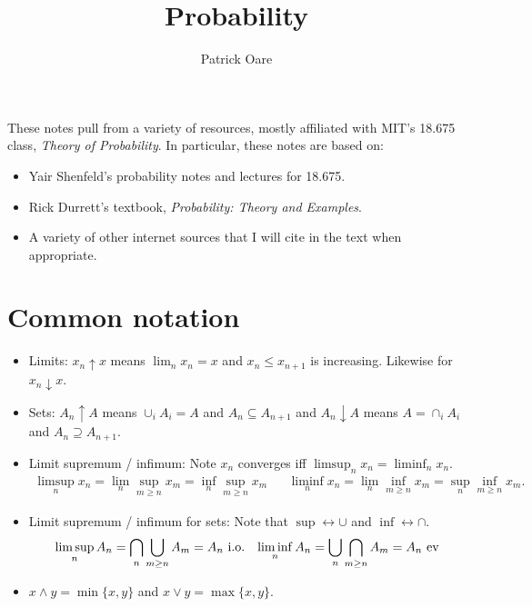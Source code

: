 \def \root {../../}			%


\newcommand{\sigB}{\sigma(\mathcal{B}_{1})}
\newcommand{\Leb}{\mathrm{Leb}}
\newcommand{\io}{\;\mathrm{i.o.}}
\newcommand{\ev}{\;\mathrm{e.v.}}

\renewcommand{\P}{\mathbb{P}}

\DeclareRobustCommand\circled[1]{\tikz[baseline=(char.base)]{\node[shape=circle,draw,inner sep=2pt] (char) {#1};}}

\title{Probability}
\author{Patrick Oare}
\date{}							%


\maketitle

 \begin{resources}
These notes pull from a variety of resources, mostly affiliated with MIT's 18.675 class, \textit{Theory of Probability}. In particular, these notes are based on:
\begin{itemize}
	\item Yair Shenfeld's probability notes and lectures for 18.675.
	\item Rick Durrett's textbook, \textit{Probability: Theory and Examples}. 
	\item A variety of other internet sources that I will cite in the text when appropriate.
\end{itemize}
\end{resources}

\section*{Common notation}

\begin{itemize}
	\item Limits: $x_n\uparrow x$ means $\lim_n x_n = x$ and $x_n \leq x_{n + 1}$ is increasing. Likewise for $x_n\downarrow x$. 
	\item Sets: $A_n\uparrow A$ means $\cup_i A_i = A$ and $A_n\subseteq A_{n + 1}$ and $A_n\downarrow A$ means $A = \cap_i A_i$ and $A_n\supseteq A_{n + 1}$. 
	\item Limit supremum / infimum: Note $x_n$ converges iff $\limsup_n x_n = \liminf_n x_n$. 
	\begin{align}
		\limsup_n x_n = \lim_n \sup_{m\geq n} x_m = \inf_n \sup_{m\geq n} x_m && \liminf_n x_n = \lim_n \inf_{m\geq n} x_m = \sup_n \inf_{m\geq n} x_m.
	\end{align}
	\item Limit supremum / infimum for sets: Note that $\sup\leftrightarrow\cup$ and $\inf\leftrightarrow\cap$. 
	\begin{align}
		\limsup_n A_n = \bigcap_n \bigcup_{m\geq n} A_m = A_n\textnormal{ i.o.} && \liminf_n A_n = \bigcup_n \bigcap_{m\geq n} A_m = A_n \textnormal{ ev}
	\end{align}
	\item $x\wedge y = \min\{x, y\}$ and $x\vee y = \max\{x, y\}$. 
\end{itemize}

